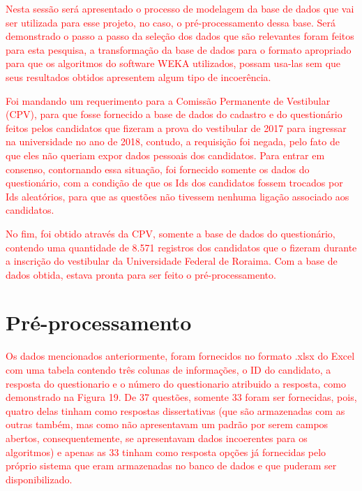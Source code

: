 \label{chapter:projeto}

\par
\textcolor{red}{Nesta sessão será apresentado o processo de modelagem da base de dados que vai ser utilizada para esse projeto, no caso, o pré-processamento dessa base. Será demonstrado o passo a passo da seleção dos dados que são relevantes foram feitos para esta pesquisa, a transformação da base de dados para o formato apropriado para que os algoritmos do software WEKA utilizados, possam usa-las sem que seus resultados obtidos apresentem algum tipo de incoerência.}

\par
\textcolor{red}{Foi mandando um requerimento para a Comissão Permanente de Vestibular (CPV), para que fosse fornecido a base de dados do cadastro e do questionário feitos pelos candidatos que fizeram a prova do vestibular de 2017 para ingressar na universidade no ano de 2018, contudo, a requisição foi negada, pelo fato de que eles não queriam expor dados pessoais dos candidatos. Para entrar em consenso, contornando essa situação, foi fornecido somente os dados do questionário, com a condição de que os Ids dos candidatos fossem trocados por Ids aleatórios, para que as questões não tivessem nenhuma ligação associado aos candidatos.}

\par
\textcolor{red}{No fim, foi obtido através da CPV, somente a base de dados do questionário, contendo uma quantidade de 8.571 registros dos candidatos que o fizeram durante a inscrição do vestibular da Universidade Federal de Roraima. Com a base de dados obtida, estava pronta para ser feito o pré-processamento.}

\section{Pré-processamento}

\par
\textcolor{red}{Os dados mencionados anteriormente, foram fornecidos no formato .xlsx do Excel com uma tabela contendo três colunas de informações, o ID do candidato, a resposta do questionario e o número do questionario atribuido a resposta, como demonstrado na Figura 19. De 37 questões, somente 33 foram ser fornecidas, pois, quatro delas tinham como respostas dissertativas (que são armazenadas com as outras também, mas como não apresentavam um padrão por serem campos abertos, consequentemente, se apresentavam dados incoerentes para os algoritmos) e apenas as 33 tinham como resposta opções já fornecidas pelo próprio sistema que eram armazenadas no banco de dados e que puderam ser disponibilizado.}

